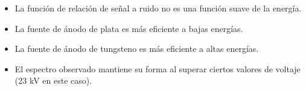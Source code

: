 \documentclass{sciposter}
\begin{document}
\begin{multicols}{3}
\begin{itemize}
	\item La función de relación de señal a ruido no es una función suave de la energía.
	\item La fuente de ánodo de plata es más eficiente a bajas energías.
	\item La fuente de ánodo de tungsteno es más eficiente a altas energías.
	\item El espectro observado mantiene su forma al superar ciertos valores de voltaje (23 kV en este caso).
\end{itemize}
%	 
	 

\small


\end{multicols}
\end{document}
